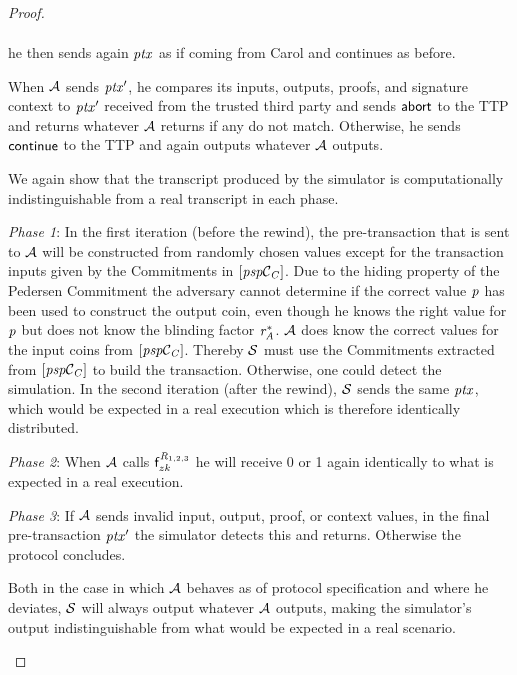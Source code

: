 \begin{proof}
\begin{asparaenum}
\begin{gather*}
        \end{gather*}
        he then sends again $\mathit{ptx}$ as if coming from Carol and continues as before.
        \item When $\mathcal{A}$ sends ${\mathit{ptx}}'$, he compares its inputs, outputs, proofs, and signature context to ${\mathit{ptx}}'$ received from the trusted third party and sends $\mathsf{abort}$ to the TTP and returns whatever $\mathcal{A}$ returns if any do not match.
        Otherwise, he sends $\mathsf{continue}$ to the TTP and again outputs whatever $\mathcal{A}$ outputs.
    \end{asparaenum}

    We again show that the transcript produced by the simulator is computationally indistinguishable from a real transcript in each phase.

    \begin{asparaitem}
        \item \textit{Phase 1}: In the first iteration (before the rewind), the pre-transaction that is sent to $\mathcal{A}$ will be constructed from randomly chosen values except for the transaction inputs given by the Commitments in $[\mathit{psp}\mathcal{C}_{\mathit{C}}]$.
        Due to the hiding property of the Pedersen Commitment the adversary cannot determine if the correct value $\mathit{p}$ has been used to construct the output coin, even though he knows the right value for $\mathit{p}$ but does not know the blinding factor $\mathit{r}_{\mathit{A}}^*$.
        $\mathcal{A}$ does know the correct values for the input coins from $[\mathit{psp}\mathcal{C}_{\mathit{C}}]$.
        Thereby $\mathcal{S}$ must use the Commitments extracted from $[\mathit{psp}\mathcal{C}_{\mathit{C}}]$ to build the transaction.
        Otherwise, one could detect the simulation.
        In the second iteration (after the rewind), $\mathcal{S}$ sends the same $\mathit{ptx}$, which would be expected in a real execution which is therefore identically distributed.
        \item \textit{Phase 2}: When $\mathcal{A}$ calls $\mathsf{f}^{\mathit{R}_{1,2,3}}_{zk}$ he will receive 0 or 1 again identically to what is expected in a real execution.
        \item \textit{Phase 3}: If $\mathcal{A}$ sends invalid input, output, proof, or context values, in the final pre-transaction ${\mathit{ptx}}'$ the simulator detects this and returns.
        Otherwise the protocol concludes.
        \item Both in the case in which $\mathcal{A}$ behaves as of protocol specification and where he deviates, $\mathcal{S}$ will always output whatever $\mathcal{A}$ outputs, making the simulator's output indistinguishable from what would be expected in a real scenario.
    \end{asparaitem}


\end{proof}
